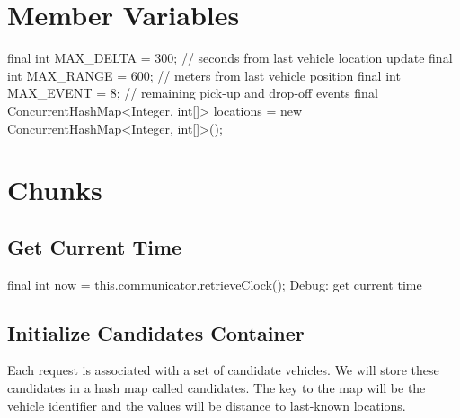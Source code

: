 \section{Member Variables}
\label{client-nearest: member-variables}

\nwenddocs{}\endmoddef\nwstartdeflinemarkup{}\nwenddeflinemarkup
final int MAX_DELTA = 300;  // seconds from last vehicle location update
final int MAX_RANGE = 600;  // meters from last vehicle position
final int MAX_EVENT = 8;    // remaining pick-up and drop-off events
final ConcurrentHashMap<Integer, int[]> locations =
  new ConcurrentHashMap<Integer, int[]>();
\nwendcode{}\nwdocspar

\section{Chunks}
\label{NearestNeighbor: chunks}

\subsection{Get Current Time}

\nwenddocs{}\endmoddef\nwstartdeflinemarkup{}\nwenddeflinemarkup
final int now = this.communicator.retrieveClock();
\LA{}Debug: get current time~{\nwtagstyle{}}\RA{}
\nwendcode{}\nwdocspar

\subsection{Initialize Candidates Container}

Each request is associated with a set of candidate vehicles. We will store
these candidates in a hash map called {\Tt{}candidates\nwendquote}. The key to the map will
be the vehicle identifier and the values will be distance to last-known
locations.

